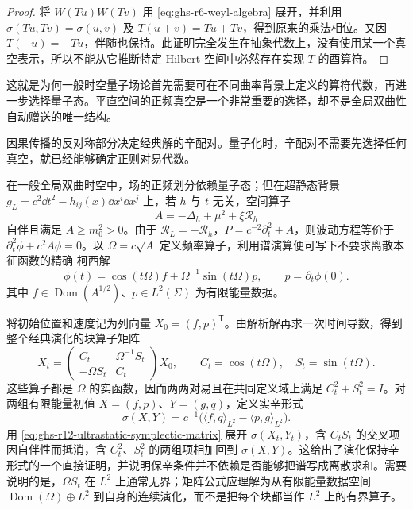 \begin{proof}
将 $W(Tu)W(Tv)$ 用 \cref{eq:ghs-r6-weyl-algebra} 展开，并利用 $\sigma(Tu,Tv)=\sigma(u,v)$ 及 $T(u+v)=Tu+Tv$，得到原来的乘法相位。又因 $T(-u)=-Tu$，伴随也保持。此证明完全发生在抽象代数上，没有使用某一个真空表示，所以不能从它推断特定 Hilbert 空间中必然存在实现 $T$ 的酉算符。
\end{proof}

这就是为何一般时空量子场论首先需要可在不同曲率背景上定义的算符代数，再进一步选择量子态。平直空间的正频真空是一个非常重要的选择，却不是全局双曲性自动赠送的唯一结构。


因果传播的反对称部分决定经典解的辛配对。量子化时，辛配对不需要先选择任何真空，就已经能够确定正则对易代数。


在一般全局双曲时空中，场的正频划分依赖量子态；但在超静态背景 $g_L=c^2\dd t^2-h_{ij}(x)\dd x^i\dd x^j$ 上，若 $h$ 与 $t$ 无关，空间算子
\[
A=-\Delta_h+\mu^2+\xi\mathcal R_h
\]
自伴且满足 $A\ge m_0^2>0$。由于 $\mathcal R_L=-\mathcal R_h$，$P=c^{-2}\partial_t^2+A$，则波动方程等价于 $\partial_t^2\phi+c^2A\phi=0$。以 $\Omega=c\sqrt A$ 定义频率算子，利用谱演算便可写下不要求离散本征函数的精确 柯西解
\begin{equation}\label{eq:ghs-r6-ultrastatic-exact-flow}
\phi(t)=\cos(t\Omega)f+\Omega^{-1}\sin(t\Omega)p,
\qquad p=\partial_t\phi(0).
\end{equation}
其中 $f\in\operatorname{Dom}(A^{1/2})$、$p\in L^2(\Sigma)$ 为有限能量数据。

将初始位置和速度记为列向量 $X_0=(f,p)^{\mathsf T}$。由解析解再求一次时间导数，得到整个经典演化的块算子矩阵
\begin{equation}\label{eq:ghs-r12-ultrastatic-symplectic-matrix}
 X_t=\begin{pmatrix}
 C_t&\Omega^{-1}S_t\\
 -\Omega S_t&C_t
 \end{pmatrix}X_0,\qquad
 C_t=\cos(t\Omega),\quad S_t=\sin(t\Omega).
\end{equation}
这些算子都是 $\Omega$ 的实函数，因而两两对易且在共同定义域上满足 $C_t^2+S_t^2=I$。对两组有限能量初值 $X=(f,p)$、$Y=(g,q)$，定义实辛形式
\[
 \sigma(X,Y)=c^{-1}\bigl(\langle f,q\rangle_{L^2}-\langle p,g\rangle_{L^2}\bigr).
\]
用 \cref{eq:ghs-r12-ultrastatic-symplectic-matrix} 展开 $\sigma(X_t,Y_t)$，含 $C_tS_t$ 的交叉项因自伴性而抵消，含 $C_t^2$、$S_t^2$ 的两组项相加回到 $\sigma(X,Y)$。这给出了演化保持辛形式的一个直接证明，并说明保辛条件并不依赖是否能够把谱写成离散求和。需要说明的是，$\Omega S_t$ 在 $L^2$ 上通常无界；矩阵公式应理解为从有限能量数据空间 $\operatorname{Dom}(\Omega)\oplus L^2$ 到自身的连续演化，而不是把每个块都当作 $L^2$ 上的有界算子。

